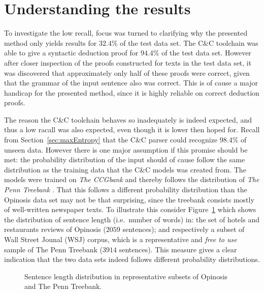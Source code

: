 \section{Understanding the results}
To investigate the low recall, focus was turned to clarifying why the presented method only yields results for $32.4\%$ of the test data set. The C\&C toolchain was able to give a syntactic deduction proof for $94.4\%$ of the test data set. However after closer inspection of the proofs constructed for texts in the test data set, it was discovered that approximately only half of these proofs were correct, given that the grammar of the input sentence also was correct. This is of cause a major handicap for the presented method, since it is highly reliable on correct deduction proofs. 

The reason the C\&C toolchain behaves so inadequately is indeed expected, and thus a low racall was also expected, even though it is lower then hoped for. Recall from Section~\ref{sec:maxEntropy} that the C\&C parser could recognize 98.4\% of unseen data. However there is one major assumption if this promise should be met: the probability distribution of the input should of cause follow the same distribution as the training data that the C\&C models was created from. The models were trained on \emph{The CCGbank} \cite{ccgBank} and thereby follows the distribution of \emph{The Penn Treebank} \cite{pennTreebank}. That this follows a different probability distribution than the Opinosis data set may not be that surprising, since the treebank consists mostly of well-written newspaper texts. To illustrate this consider Figure~\ref{fig:distBias} which shows the distribution of sentence length (i.e.\ number of words) in: the set of hotels and restaurants reviews of Opinosis ($\num{2059}$ sentences); and respectively a subset of Wall Street Jounal (WSJ) corpus, which is a representative and \emph{free to use} sample of The Penn Treebank ($\num{3914}$ sentences). This measure gives a clear indication that the two data sets indeed follows different probability distributions.
\begin{figure}[ht]
\begin{center}
\end{center}
\vspace{-1em}
\caption{Sentence length distribution in representative subsets of Opinosis and The Penn Treebank.}
\label{fig:distBias}
\end{figure}

